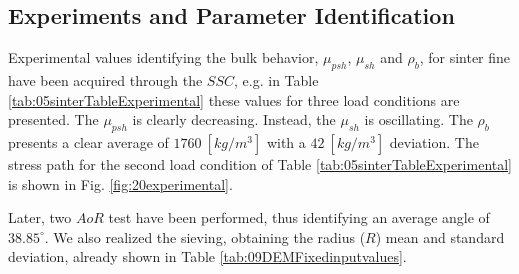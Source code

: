 \subsection{Experiments and Parameter Identification}
\label{subsec:experimentsparameteridentification}

Experimental values identifying the bulk behavior, $\mu_{psh}$, $\mu_{sh}$ and $\rho_{b}$, 
for sinter fine have been acquired through the $SSC$, e.g. in Table
\ref{tab:05sinterTableExperimental}
these values for three load conditions are presented.
The $\mu_{psh}$ is clearly decreasing. 
Instead, the $\mu_{sh}$ is oscillating.
The $\rho_b$ presents a clear average of $1760 ~ [kg/m^3]$ with a $42 ~
[kg/m^3]$ deviation.
The stress path for the second load condition of Table
\ref{tab:05sinterTableExperimental} is shown in Fig.
\ref{fig:20experimental}.

Later, two $AoR$ test have been performed, thus identifying an average angle of
$38.85 ^\circ$.
We also realized the sieving, obtaining the radius ($R$) mean and standard
deviation, already shown in Table \ref{tab:09DEMFixedinputvalues}.

